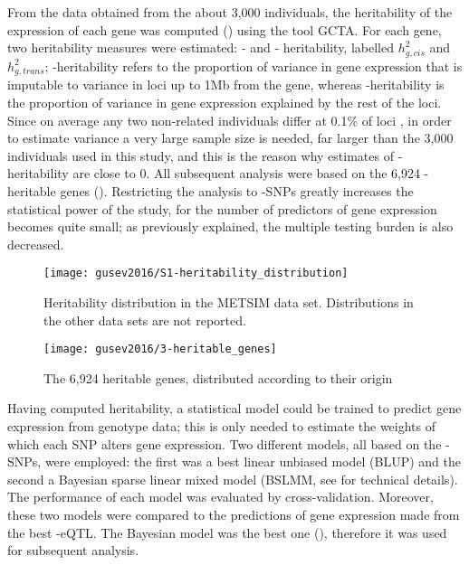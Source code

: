 \documentclass[../main.tex]{subfiles}
\begin{document}
From the data obtained from the about 3,000 individuals, the 
heritability of the expression of each gene was computed 
() using the tool GCTA\autocite{Yang2011a}. For 
each gene, two heritability measures were estimated: \cis- and \trans- 
heritability, labelled $h_{g,cis}^2$ and $h_{g,trans}^2$; 
\cis-heritability refers to the proportion of variance in gene 
expression that is imputable to variance in loci up to 1Mb from the 
gene, whereas \trans-heritability is the proportion of variance in gene 
expression explained by the rest of the loci. Since on average any two 
non-related individuals differ at 0.1\% of loci \autocite{Auton2015}, in 
order to estimate \trans variance a very large sample size is needed, 
far larger than the 3,000 individuals used in this study, and this is 
the reason why estimates of \trans-heritability are close to $0$. All 
subsequent analysis were based on the 6,924 \cis-heritable genes 
(). Restricting the analysis to \cis-SNPs greatly 
increases the statistical power of the study, for the number of 
predictors of gene expression becomes quite small; as previously 
explained, the multiple testing burden is also decreased.

\begin{figure}
	\centering
	\texttt{[image: gusev2016/S1-heritability\_distribution]}
	\caption{Heritability distribution in the METSIM data set. 
		Distributions in the other data sets are not reported.}
\end{figure}

\begin{figure}
	\centering
	\texttt{[image: gusev2016/3-heritable\_genes]}
	\caption{The 6,924 heritable genes, distributed according to their 
origin}
\end{figure}

Having computed heritability, a statistical model could be trained to 
predict gene expression from genotype data; this is only needed to 
estimate the weights of which each SNP alters gene expression. Two 
different models, all based on the \cis-SNPs, were employed: the first 
was a best linear unbiased model (BLUP) and the second a Bayesian sparse 
linear mixed model (BSLMM, see  for technical 
details). The performance of each model was evaluated by 
cross-validation. Moreover, these two models were compared to the 
predictions of gene expression made from the best \cis-eQTL. The 
Bayesian model was the best one (), therefore it was 
used for subsequent analysis.
\end{document}
